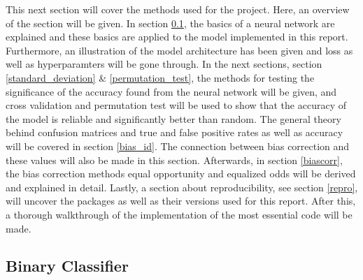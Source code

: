 \documentclass[11pt, fleqn, titlepage]{article}
\begin{document}
	This next section will cover the methods used for the project. Here, an overview of the section will be given. In section \ref{Feed-forward neural}, the basics of a neural network are explained and these basics are applied to the model implemented in this report. Furthermore, an illustration of the model architecture has been given and loss as well as hyperparamters will be gone through. In the next sections, section \ref{standard_deviation} \& \ref{permutation_test}, the methods for testing the significance of the accuracy found from the neural network will be given, and cross validation and permutation test will be used to show that the accuracy of the model is reliable and significantly better than random. The general theory behind confusion matrices and true and false positive rates as well as accuracy will be covered in section \ref{bias_id}. The connection between bias correction and these values will also be made in this section. Afterwards, in section \ref{biascorr}, the bias correction methods equal opportunity and equalized odds will be derived and explained in detail. Lastly, a section about reproducibility, see section \ref{repro}, will uncover the packages as well as their versions used for this report. After this, a thorough walkthrough of the implementation of the most essential code will be made.
	
	\subsection{Binary Classifier}\label{Feed-forward neural}
\end{document}
